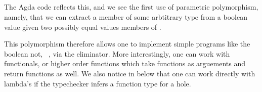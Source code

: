 \begin{code}%
\>[0]\<%
\\
\>[0]\AgdaSpace{}%
\AgdaSymbol{:}\AgdaSpace{}%
\AgdaSymbol{\{}\AgdaSpace{}%
\AgdaSymbol{:}\AgdaSpace{}%
\AgdaSymbol{\}}\AgdaSpace{}%
\AgdaSpace{}%
\AgdaSpace{}%
\AgdaSpace{}%
\AgdaSpace{}%
\AgdaSpace{}%
\AgdaSpace{}%
\AgdaSpace{}%
\<%
\\
\>[0]\AgdaSpace{}%
\AgdaSpace{}%
\AgdaSpace{}%
\AgdaSpace{}%
\AgdaSpace{}%
\AgdaSpace{}%
\AgdaSymbol{=}\AgdaSpace{}%
\<%
\\
\>[0]\AgdaSpace{}%
\AgdaSpace{}%
\AgdaSpace{}%
\AgdaSpace{}%
\AgdaSpace{}%
\AgdaSpace{}%
\AgdaSymbol{=}\AgdaSpace{}%
\<%
\\
\>[0]\<%
\end{code}

The Agda code reflects this, and we see the first use of parametric
polymorphism, namely, that we can extract a member of some arbtitrary type  from a boolean
value given two possibly equal values members of .

This polymorphism therefore allows one to implement simple programs like the
boolean not, ~, via the eliminator. More interestingly, one can work with
functionals, or higher order functions which take functions as arguements and
return functions as well. We also notice in  below that
one can work directly with lambda's if the typechecker infers a function type
for a hole.

